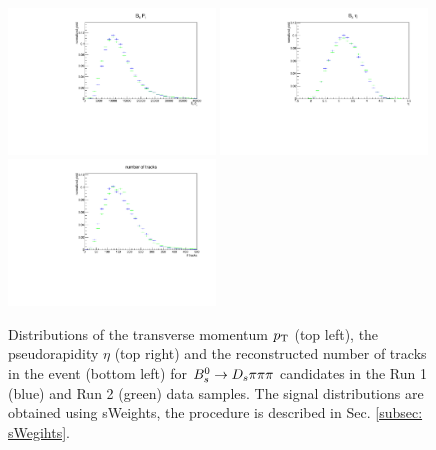 \begin{figure}[h]
\includegraphics[height=7.cm,width=0.49\textwidth]{figs/Tagging/Bs_Pt_norm_RunsComparison.pdf}
\includegraphics[height=7.cm,width=0.49\textwidth]{figs/Tagging/Bs_eta_norm_RunsComparison.pdf}\\
\includegraphics[height=7.cm,width=0.49\textwidth]{figs/Tagging/nTracks_norm_RunsComparison.pdf}
\caption{Distributions of the transverse momentum $\mbox{$p_{\mathrm{ T}}$}$ (top left), 
the pseudorapidity $\eta$ (top right) and the reconstructed number of tracks in the event (bottom left) for  ${{B}^0_{s}}\rightarrow{\ensuremath{{D}_{s}}}{\ensuremath{\pi}}{\ensuremath{\pi}}{\ensuremath{\pi}}$ candidates in the Run 1 (blue) and Run 2 (green) data samples. 
The signal distributions are obtained using sWeights, the procedure is described in Sec. \ref{subsec: sWegihts}.}
\label{fig:kinematics_data_comparison}
\end{figure}

